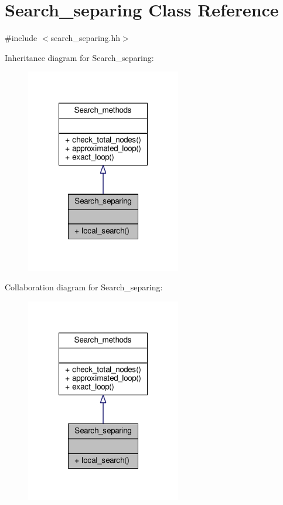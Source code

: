 \hypertarget{classSearch__separing}{\section{Search\-\_\-separing Class Reference}
\label{classSearch__separing}
}


{\ttfamily \#include $<$search\-\_\-separing.\-hh$>$}



Inheritance diagram for Search\-\_\-separing\-:
\nopagebreak
\begin{figure}[H]
\begin{center}
\leavevmode
\includegraphics[width=192pt]{classSearch__separing__inherit__graph}
\end{center}
\end{figure}


Collaboration diagram for Search\-\_\-separing\-:
\nopagebreak
\begin{figure}[H]
\begin{center}
\leavevmode
\includegraphics[width=192pt]{classSearch__separing__coll__graph}
\end{center}
\end{figure}
